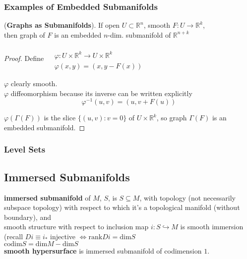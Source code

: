 
\subsubsection*{Examples of Embedded Submanifolds }

\begin{lemma}[8.6] (\textbf{Graphs as Submanifolds}). 
If open $U \subset \mathbb{R}^n$, smooth $F: U \to \mathbb{R}^k$, \\
then graph of $F$ is an embedded $n$-dim. submanifold of $\mathbb{R}^{n+k}$
\end{lemma}

\begin{proof}
  Define $\begin{aligned} 
    & \quad \\
    & \varphi: U \times \mathbb{R}^k \to U \times \mathbb{R}^k \\ 
    & \varphi(x,y) = (x,y - F(x)) \end{aligned}$

$\varphi$ clearly smooth. \\
$\varphi$ diffeomorphism because its inverse can be written explicitly
\[
\varphi^{-1}(u,v) = (u ,  v + F(u))
\]

$\varphi( \Gamma(F))$ is the slice $\lbrace (u,v) : v = 0 \rbrace $ of $U\times \mathbb{R}^k$, so graph $\Gamma(F)$ is an embedded submanifold.  



\end{proof}



\subsubsection*{Level Sets}


\subsection*{Immersed Submanifolds}

\begin{definition}
  \textbf{immersed submanifold } of $M$, $S$, is $S\subseteq M$, with topology (not necessarily subspace topology) with respect to which it's a topological manifold (without boundary), and \\
\phantom{ \quad \quad \, }   smooth structure with respect to inclusion map $i : S \hookrightarrow M$ is smooth immersion (recall $Di \equiv i_*$ injective $\Longleftrightarrow \text{rank}Di = \text{dim}S$ \\

$\text{codim}S = \text{dim}M - \text{dim}S$ \\

\textbf{smooth hypersurface} is immersed submanifold of codimension $1$.  
\end{definition}

